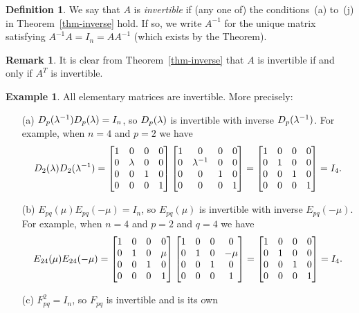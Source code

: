 \documentclass[reqno]{amsart}
\theoremstyle{definition}
\newtheorem{remark}[theorem]{Remark}
\newtheorem{definition}[theorem]{Definition}
\newtheorem{example}[theorem]{Example}
\newcommand{\dfn}[1]{\emph{{#1}}\index{#1}}
\begin{document}
\begin{definition}\label{defn-invertible}
 We say that $A$ is \dfn{invertible} if (any one of) the
 conditions~(a) to~(j) in Theorem~\ref{thm-inverse} hold.  If so, we
 write $A^{-1}$ for the unique matrix satisfying $A^{-1}A=I_n=AA^{-1}$
 (which exists by the Theorem).
\end{definition}

\begin{remark}\label{rem-transpose-inverse}
 It is clear from Theorem~\ref{thm-inverse} that $A$ is invertible if
 and only if $A^T$ is invertible.
\end{remark}

\begin{example}\label{eg-elem-invertible}
 All elementary matrices are invertible.  More precisely:
 \begin{itemize}
  \item[(a)] $D_p(\lambda^{-1})D_p(\lambda)=I_n$, so $D_p(\lambda)$ is invertible
   with inverse $D_p(\lambda^{-1})$.  For example, when $n=4$ and $p=2$ we
   have 
   \[ 
    D_2(\lambda)D_2(\lambda^{-1}) = 
    \left[\begin{matrix} 1&0&0&0 \\ 0&\lambda&0&0 \\ 0&0&1&0 \\ 0&0&0&1 \end{matrix}\right]
    \left[\begin{matrix} 1&0&0&0 \\ 0&\lambda^{-1}&0&0 \\ 0&0&1&0 \\ 0&0&0&1 \end{matrix}\right]
    =
    \left[\begin{matrix} 1&0&0&0 \\ 0&1&0&0 \\ 0&0&1&0 \\ 0&0&0&1 \end{matrix}\right]
    = I_4.
   \] 
  \item[(b)] $E_{pq}(\mu)E_{pq}(-\mu)=I_n$, so $E_{pq}(\mu)$ is
   invertible with inverse $E_{pq}(-\mu)$.  For example, when $n=4$
   and $p=2$ and $q=4$ we have 
   \[ 
    E_{24}(\mu)E_{24}(-\mu) = 
    \left[\begin{matrix} 1&0&0&0 \\ 0&1&0&\mu \\ 0&0&1&0 \\ 0&0&0&1 \end{matrix}\right]
    \left[\begin{matrix} 1&0&0&0 \\ 0&1&0&-\mu \\ 0&0&1&0 \\ 0&0&0&1 \end{matrix}\right]
    =
    \left[\begin{matrix} 1&0&0&0 \\ 0&1&0&0 \\ 0&0&1&0 \\ 0&0&0&1 \end{matrix}\right]
    = I_4.
   \] 
  \item[(c)] $F_{pq}^2=I_n$, so $F_{pq}$ is invertible and is its own

\end{itemize}
\end{example}
\end{document}
